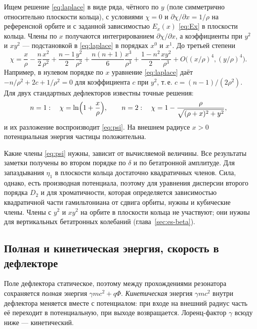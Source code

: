 Ищем решение \eqref{eq:laplace} в виде ряда, чётного по $y$ (поле симметрично относительно плоскости кольца), с условиями $\chi=0$ и $\partial\chi/\partial x=1/\rho$ на референсной орбите и с заданной зависимостью $E_x(x)$ \eqref{eq:Ex} в плоскости кольца. Члены по $x$ получаются интегрированием $\partial\chi/\partial x$, а коэффициенты при $y^2$ и $xy^2$ --- подстановкой в \eqref{eq:laplace} в порядках $x^0$ и $x^1$. До третьей степени
\begin{equation}
\label{eq:psi}
\chi
=\frac{x}{\rho}
-\frac{n}{2}\frac{x^2}{\rho^2}
+\frac{n-1}{2}\frac{y^2}{\rho^2}
+\frac{n(n+1)}{6}\frac{x^3}{\rho^3}
+\frac{1-n^2}{2}\frac{xy^2}{\rho^3}
+O\bigl((x/\rho)^4,(y/\rho)^4\bigr).
\end{equation}
Например, в нулевом порядке по $x$ уравнение \eqref{eq:laplace} даёт $-n/\rho^2+2c+1/\rho^2=0$ для коэффициента $c$ при $y^2$, т.\,е. $c=(n-1)/(2\rho^2)$. Для двух стандартных дефлекторов известны точные решения:
\begin{equation}
\label{eq:psi-exact}
n=1:\quad \chi=\ln\Bigl(1+\frac{x}{\rho}\Bigr),
\qquad
n=2:\quad \chi=1-\frac{\rho}{\sqrt{(\rho+x)^2+y^2}},
\end{equation}
и их разложение воспроизводит \eqref{eq:psi}. На внешнем радиусе $x>0$ потенциальная энергия частицы положительна.

Какие члены \eqref{eq:psi} нужны, зависит от вычисляемой величины. Все результаты заметки получены во втором порядке по $\delta$ и по бетатронной амплитуде. Для запаздывания $\eta_1$ в плоскости кольца достаточно квадратичных членов. Сила, однако, есть производная потенциала, поэтому для уравнения дисперсии второго порядка $D_2$ и для хроматичности, которая определяется зависимостью квадратичной части гамильтониана от сдвига орбиты, нужны и кубические члены. Члены с $y^2$ и $xy^2$ на орбите в плоскости кольца не участвуют; они нужны для вертикальных бетатронных колебаний (глава~\ref{sec:es-beta}).

\subsection{Полная и кинетическая энергия, скорость в дефлекторе}

Поле дефлектора статическое, поэтому между прохождениями резонатора сохраняется \emph{полная} энергия $\gamma mc^2+q\Phi$. \emph{Кинетическая} энергия $\gamma mc^2$ внутри дефлектора меняется вместе с потенциалом: при входе на внешний радиус часть её переходит в потенциальную, при выходе возвращается. Лоренц-фактор $\gamma$ всюду ниже --- кинетический.

